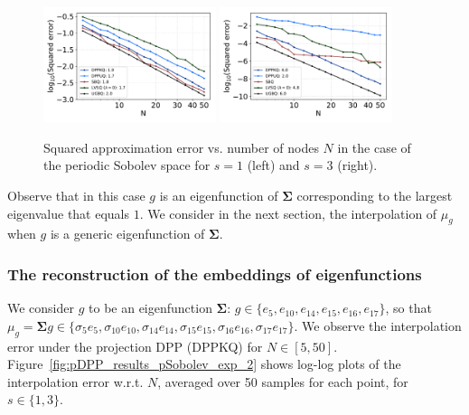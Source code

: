 \documentclass[twoside,11pt]{book}
\numberwithin{theorem}{chapter}
\numberwithin{definition}{chapter}
\numberwithin{proposition}{chapter}
\numberwithin{corollary}{chapter}
\numberwithin{example}{chapter}
\numberwithin{lemma}{chapter}
\numberwithin{assumption}{chapter}
\begin{document}
\begin{figure}
\centering
\includegraphics[width=0.45\textwidth]{img/neurips/Sobolev/Sobolev_kernel_order_1_fig_1.pdf}
\includegraphics[width=0.45\textwidth]{img/neurips/Sobolev/Sobolev_kernel_order_3_fig_1.pdf}\\
\caption{Squared approximation error vs. number of nodes $N$ in the case of the periodic Sobolev space for $s = 1$ (left) and $s=3$ (right).
\label{fig:pDPP_results_pSobolev_exp_1}}
\end{figure}

Observe that in this case $g$ is an eigenfunction of $\bm{\Sigma}$ corresponding to the largest eigenvalue that equals $1$. We consider in the next section, the interpolation of $\mu_{g}$ when $g$ is a generic eigenfunction of $\bm{\Sigma}$.

\subsubsection{The reconstruction of the embeddings of eigenfunctions}
We consider $g$ to be an eigenfunction $\bm{\Sigma}$: $g \in \{e_{5},e_{10},e_{14},e_{15},e_{16},e_{17}\}$, so that $\mu_{g} = \bm{\Sigma}g \in \{\sigma_{5}e_{5},\sigma_{10}e_{10},\sigma_{14}e_{14},\sigma_{15}e_{15},\sigma_{16}e_{16},\sigma_{17}e_{17}\}$. We observe the interpolation error under the projection DPP (DPPKQ) for $N \in [5,50]$. Figure~\ref{fig:pDPP_results_pSobolev_exp_2} shows log-log plots of the interpolation error  w.r.t. $N$, averaged over 50 samples for each point, for $s \in \{1,3\}$.
\end{document}
